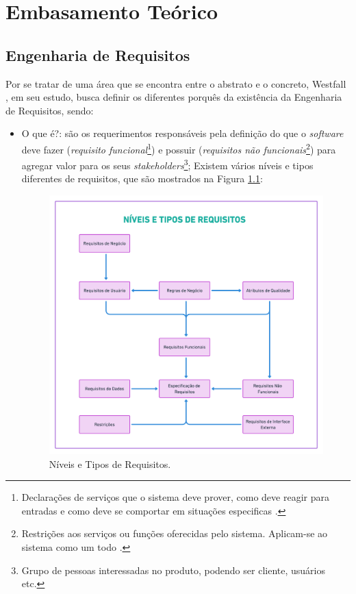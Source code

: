 \chapter[Embasamento Teórico]{Embasamento Teórico}

\section{Engenharia de Requisitos} 

Por se tratar de uma área que se encontra entre o abstrato e o concreto, Westfall \cite{westfall_5w2h}, em seu estudo, busca definir os diferentes porquês da existência da Engenharia de Requisitos, sendo:

\begin{itemize}
    \item O que é?: são os requerimentos responsáveis pela definição do que o \textit{software} deve fazer (\textit{requisito funcional}\footnote{Declarações de serviços que o sistema deve prover, como deve reagir para entradas e como deve se comportar em situações especificas \cite{sommerville2011}.}) e possuir (\textit{requisitos não funcionais}\footnote{Restrições aos serviços ou funções oferecidas pelo sistema. Aplicam-se ao sistema como um todo \cite{sommerville2011}.}) para agregar valor para os seus \textit{stakeholders}\footnote{Grupo de pessoas interessadas no produto, podendo ser cliente, usuários etc.}; Existem vários níveis e tipos diferentes de requisitos, que são mostrados na Figura \ref{lev_tipo_req}:
    
    \begin{figure}[htb]
        \begin{center}
            \includegraphics[width=12cm, height=10cm, keepaspectratio]{figuras/lev_tipo_req.png}
            \caption{{Níveis e Tipos de Requisitos. \cite{westfall_5w2h}}}
            \label{lev_tipo_req}
        \end{center}
    \end{figure}
    

\end{itemize}
